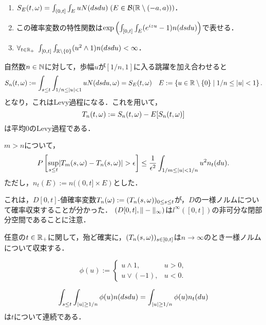 \documentclass[uplatex,dvipdfmx]{jsreport}
\begin{document}
\begin{lemma}\mbox{}
    \begin{enumerate}
        \item $S_E(t,\omega)=\int_{(0,t]}\int_E uN(dsdu)\;(E\in\mathcal{B}(\mathbb{R}\setminus(-a,a)))$．
        \item この確率変数の特性関数は$\exp\left(\int_{[0,t]}\int_E(e^{izu}-1)n(dsdu)\right)$で表せる．
        \item $\forall_{t\in\mathbb{R}_+}\;\int_{[0,t]}\int_{\mathbb{R}\setminus\{0\}}(u^2\land 1)n(dsdu)<\infty$．
    \end{enumerate}
\end{lemma}

\begin{notation}
    自然数$n\in\mathbb{N}$に対して，歩幅$u$が$[1/n,1]$に入る跳躍を加え合わせると
    \[S_n(t,\omega):=\int_{s\le t}\int_{1/n\le\lvert u\rvert<1}uN(dsdu,\omega)=S_E(t,\omega)\quad E:=\left\{u\in\mathbb{R}\setminus\{0\}\mid 1/n\le\lvert u\rvert<1\right\}.\]
    となり，これはLevy過程になる．これを用いて，
    \[T_n(t,\omega):=S_n(t,\omega)-E[S_n(t,\omega)]\]
    は平均$0$のLevy過程である．
\end{notation}

\begin{lemma}
    $m>n$について，
    \[P\left[\sup_{s\le t}\lvert T_m(s,\omega)-T_n(s,\omega)\rvert>\epsilon\right]\le\frac{1}{\epsilon^2}\int_{1/m\le\lvert u\rvert<1/n}u^2n_t(du).\]
    ただし，$n_t(E):=n((0,t]\times E)$とした．
\end{lemma}
\begin{remarks}
    これは，$D[0,t]$-値確率変数$T_n(\omega):=(T_n(s,\omega))_{0\le s\le t}$が，$D$の一様ノルムについて確率収束することが分かった．
    $(D[0,t],\|-\|_\infty)$は$l^\infty([0,t])$の非可分な閉部分空間であることに注意．
\end{remarks}

\begin{lemma}[Banach空間値確率変数の概収束性]
    任意の$t\in\mathbb{R}_+$に関して，殆ど確実に，$(T_n(s,\omega))_{s\in[0,t]}$は$n\to\infty$のとき一様ノルムについて収束する．
\end{lemma}

\begin{notation}
    \[\phi(u):=\begin{cases}
        u\land 1,&u>0,\\
        u\lor(-1),&u<0.
    \end{cases}\]
\end{notation}

\begin{lemma}
    \[\int_{s\le t}\int_{\lvert u\rvert\ge 1/n}\phi(u)n(dsdu)=\int_{\lvert u\rvert\ge 1/n}\phi(u)n_t(du)\]
    は$t$について連続である．
\end{lemma}
\end{document}
